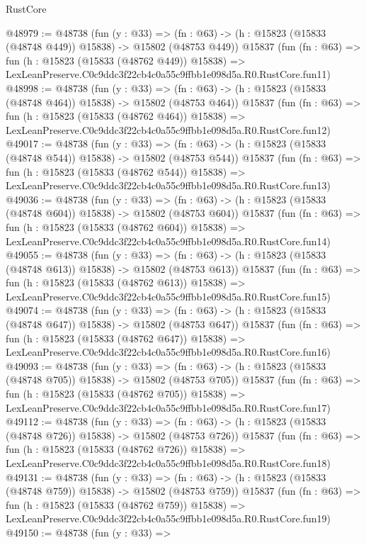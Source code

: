 \begin{lexlean}{RustCore}
\begin{coremodule}
@48979 := @48738
    (fun (y : @33) =>
    (fn : @63) -> (h : @15823 (@15833 (@48748 @449)) @15838) -> @15802 (@48753 @449))
    @15837
    (fun (fn : @63) =>
    fun (h : @15823 (@15833 (@48762 @449)) @15838) =>
    LexLeanPreserve.C0c9ddc3f22cb4c0a55c9ffbb1e098d5a.R0.RustCore.fun11)
@48998 := @48738
    (fun (y : @33) =>
    (fn : @63) -> (h : @15823 (@15833 (@48748 @464)) @15838) -> @15802 (@48753 @464))
    @15837
    (fun (fn : @63) =>
    fun (h : @15823 (@15833 (@48762 @464)) @15838) =>
    LexLeanPreserve.C0c9ddc3f22cb4c0a55c9ffbb1e098d5a.R0.RustCore.fun12)
@49017 := @48738
    (fun (y : @33) =>
    (fn : @63) -> (h : @15823 (@15833 (@48748 @544)) @15838) -> @15802 (@48753 @544))
    @15837
    (fun (fn : @63) =>
    fun (h : @15823 (@15833 (@48762 @544)) @15838) =>
    LexLeanPreserve.C0c9ddc3f22cb4c0a55c9ffbb1e098d5a.R0.RustCore.fun13)
@49036 := @48738
    (fun (y : @33) =>
    (fn : @63) -> (h : @15823 (@15833 (@48748 @604)) @15838) -> @15802 (@48753 @604))
    @15837
    (fun (fn : @63) =>
    fun (h : @15823 (@15833 (@48762 @604)) @15838) =>
    LexLeanPreserve.C0c9ddc3f22cb4c0a55c9ffbb1e098d5a.R0.RustCore.fun14)
@49055 := @48738
    (fun (y : @33) =>
    (fn : @63) -> (h : @15823 (@15833 (@48748 @613)) @15838) -> @15802 (@48753 @613))
    @15837
    (fun (fn : @63) =>
    fun (h : @15823 (@15833 (@48762 @613)) @15838) =>
    LexLeanPreserve.C0c9ddc3f22cb4c0a55c9ffbb1e098d5a.R0.RustCore.fun15)
@49074 := @48738
    (fun (y : @33) =>
    (fn : @63) -> (h : @15823 (@15833 (@48748 @647)) @15838) -> @15802 (@48753 @647))
    @15837
    (fun (fn : @63) =>
    fun (h : @15823 (@15833 (@48762 @647)) @15838) =>
    LexLeanPreserve.C0c9ddc3f22cb4c0a55c9ffbb1e098d5a.R0.RustCore.fun16)
@49093 := @48738
    (fun (y : @33) =>
    (fn : @63) -> (h : @15823 (@15833 (@48748 @705)) @15838) -> @15802 (@48753 @705))
    @15837
    (fun (fn : @63) =>
    fun (h : @15823 (@15833 (@48762 @705)) @15838) =>
    LexLeanPreserve.C0c9ddc3f22cb4c0a55c9ffbb1e098d5a.R0.RustCore.fun17)
@49112 := @48738
    (fun (y : @33) =>
    (fn : @63) -> (h : @15823 (@15833 (@48748 @726)) @15838) -> @15802 (@48753 @726))
    @15837
    (fun (fn : @63) =>
    fun (h : @15823 (@15833 (@48762 @726)) @15838) =>
    LexLeanPreserve.C0c9ddc3f22cb4c0a55c9ffbb1e098d5a.R0.RustCore.fun18)
@49131 := @48738
    (fun (y : @33) =>
    (fn : @63) -> (h : @15823 (@15833 (@48748 @759)) @15838) -> @15802 (@48753 @759))
    @15837
    (fun (fn : @63) =>
    fun (h : @15823 (@15833 (@48762 @759)) @15838) =>
    LexLeanPreserve.C0c9ddc3f22cb4c0a55c9ffbb1e098d5a.R0.RustCore.fun19)
@49150 := @48738
    (fun (y : @33) =>

\end{coremodule}
\end{lexlean}
